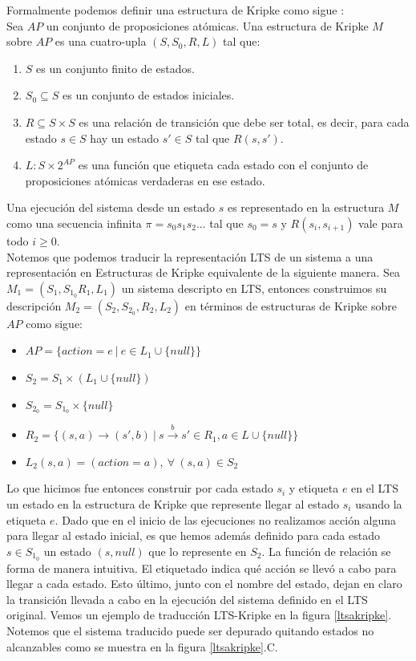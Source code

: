 \documentclass[titlepage, 12pt]{book}
\begin{document}
Formalmente podemos definir una estructura de Kripke como sigue \cite{Clarke}:\\

Sea $AP$ un conjunto de proposiciones at\'omicas. Una estructura de Kripke $M$ sobre $AP$ es una cuatro-upla $(S,S_0,R,L)$ tal que:

\begin{enumerate}
\item $S$ es un conjunto finito de estados.
\item $S_0 \subseteq S$ es un conjunto de estados iniciales.
\item $R \subseteq S \times S$ es una relaci\'on de transici\'on que debe ser total, es decir, para cada estado $s \in S$ hay un estado $s' \in S$ tal que $R(s,s')$.
\item $L : S \times 2^{AP}$ es una funci\'on que etiqueta cada estado con el conjunto de proposiciones at\'omicas verdaderas en ese estado.
\end{enumerate}

Una ejecuci\'on del sistema desde un estado $s$ es representado en la estructura $M$ como una secuencia infinita $\pi = s_0s_1s_2...$ tal que $s_0 = s$ y $R(s_i,s_{i+1})$ vale para todo $i \geq 0$.\\

Notemos que podemos traducir la representaci\'on LTS de un sistema a una representaci\'on en Estructuras de Kripke equivalente de la siguiente manera. Sea $M_1 = (S_1, S_{1_0} R_1, L_1)$ un sistema descripto en LTS, entonces construimos su descripci\'on $M_2 = (S_2,S_{2_0},R_2,L_2)$ en t\'erminos de estructuras de Kripke sobre $AP$ como sigue:
\begin{itemize}
\item $ AP = \{action = e ~|~ e \in L_1 \cup \{null\}\} $
\item $ S_2 = S_1 \times (L_1 \cup \{null\}) $
\item $S_{2_0} = S_{1_0} \times \{null\}$
\item $R_2 = \{(s,a) \rightarrow (s',b) ~|~ s\overset{b}{\rightarrow}s' \in R_1, a \in L \cup \{null\}\}$
\item $L_2(s,a) = (action = a), ~\forall~(s,a) \in S_2$
\end{itemize}
Lo que hicimos fue entonces construir por cada estado $s_i$ y etiqueta $e$ en el LTS un estado en la estructura de Kripke que represente llegar al estado $s_i$ usando la etiqueta $e$. Dado que en el inicio de las ejecuciones no realizamos acci\'on alguna para llegar al estado inicial, es que hemos adem\'as definido para cada estado $s \in S_{1_0}$ un estado $(s,null)$ que lo represente en $S_2$. La funci\'on de relaci\'on se forma de manera intuitiva. El etiquetado indica qu\'e acci\'on se llev\'o a cabo para llegar a cada estado. Esto \'ultimo, junto con el nombre del estado, dejan en claro la transici\'on llevada a cabo en la ejecuci\'on del sistema definido en el LTS original. Vemos un ejemplo de traducci\'on LTS-Kripke en la figura \ref{ltsakripke}. Notemos que el sistema traducido puede ser depurado quitando estados no alcanzables como se muestra en la figura \ref{ltsakripke}.C.
\end{document}
